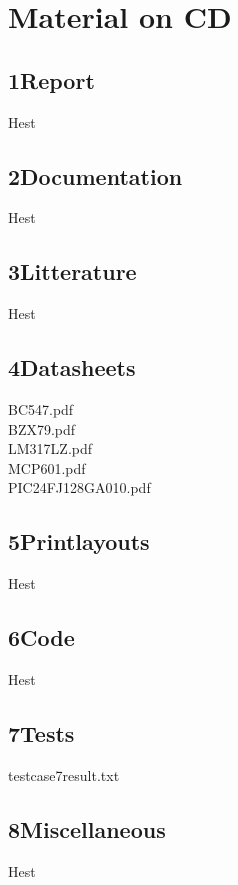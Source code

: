 \chapter{Material on CD}
\section{1Report}
Hest
\section{2Documentation}
Hest
\section{3Litterature}
Hest
\section{4Datasheets}
BC547.pdf\\
BZX79.pdf\\
LM317LZ.pdf\\
MCP601.pdf\\
PIC24FJ128GA010.pdf\\
\section{5Printlayouts}
Hest
\section{6Code}
Hest
\section{7Tests}
testcase7result.txt\\
\section{8Miscellaneous}
Hest
